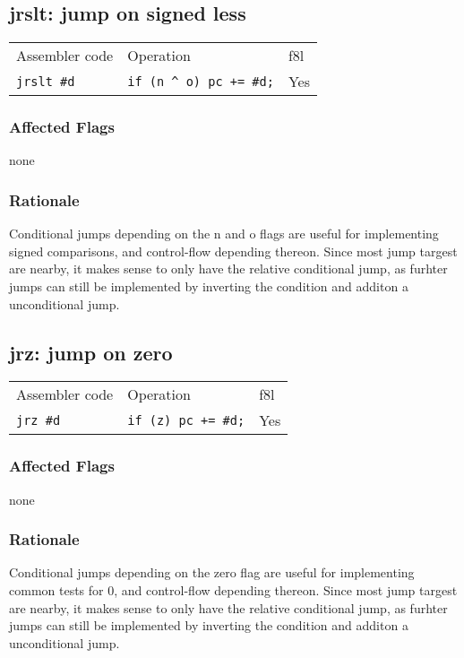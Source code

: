 \documentclass{book}
\begin{document}
\subsection{jrslt: jump on signed less}

\begin{tabular}{l l l}
Assembler code     & Operation                         & f8l \\
\texttt{jrslt \#d} & \texttt{if (n \^{} o) pc += \#d;} & Yes \\
\end{tabular}

\subsubsection*{Affected Flags}

none

\subsubsection*{Rationale}

Conditional jumps depending on the n and o flags are useful for implementing signed comparisons, and control-flow depending thereon. Since most jump targest are nearby, it makes sense to only have the relative conditional jump, as furhter jumps can still be implemented by inverting the condition and additon a unconditional jump.


\subsection{jrz: jump on zero}

\begin{tabular}{l l l}
Assembler code   & Operation                  & f8l \\
\texttt{jrz \#d} & \texttt{if (z) pc += \#d;} & Yes \\
\end{tabular}

\subsubsection*{Affected Flags}

none

\subsubsection*{Rationale}

Conditional jumps depending on the zero flag are useful for implementing common tests for 0, and control-flow depending thereon. Since most jump targest are nearby, it makes sense to only have the relative conditional jump, as furhter jumps can still be implemented by inverting the condition and additon a unconditional jump.
\end{document}
